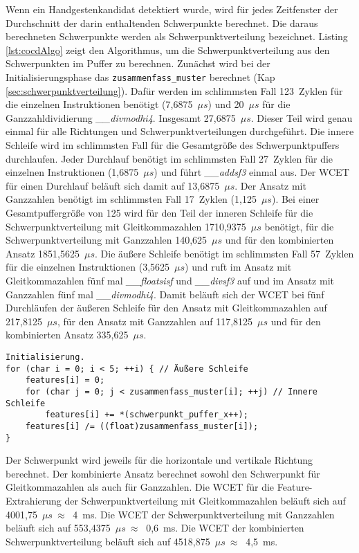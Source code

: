 Wenn ein Handgestenkandidat detektiert wurde, wird für jedes Zeitfenster der Durchschnitt der darin enthaltenden Schwerpunkte berechnet. Die daraus berechneten Schwerpunkte werden als Schwerpunktverteilung bezeichnet.
Listing \ref{lst:cocdAlgo} zeigt den Algorithmus, um die Schwerpunktverteilung aus den Schwerpunkten im Puffer zu berechnen. Zunächst wird bei der Initialisierungsphase das \texttt{zusammenfass\_muster} berechnet
(Kap \ref{sec:schwerpunktverteilung}). Dafür werden im schlimmsten Fall 123~Zyklen für die einzelnen Instruktionen benötigt (7,6875~$\mu s$) und 20~$\mu s$ für die Ganzzahldividierung \textit{\_\_divmodhi4}. Insgesamt
27,6875~$\mu s$. Dieser Teil wird genau einmal für alle Richtungen und Schwerpunktverteilungen durchgeführt.
\newline
\newline
Die innere Schleife wird im schlimmsten Fall für die Gesamtgröße des Schwerpunktpuffers durchlaufen.
Jeder Durchlauf benötigt im schlimmsten Fall 27~Zyklen für die einzelnen Instruktionen (1,6875~$\mu s$) und führt \textit{\_\_addsf3} einmal aus. Der WCET für einen Durchlauf beläuft sich damit auf 13,6875~$\mu s$.
Der Ansatz mit Ganzzahlen benötigt im schlimmsten Fall 17~Zyklen (1,125~$\mu s$). Bei einer Gesamtpuffergröße von 125 wird für den Teil der inneren Schleife für die Schwerpunktverteilung mit Gleitkommazahlen
1710,9375~$\mu s$ benötigt, für die Schwerpunktverteilung mit Ganzzahlen 140,625~$\mu s$ und für den kombinierten Ansatz 1851,5625~$\mu s$. Die äußere Schleife benötigt im schlimmsten Fall 57~Zyklen für die einzelnen
Instruktionen (3,5625~$\mu s$) und ruft im Ansatz mit Gleitkommazahlen fünf mal \textit{\_\_floatsisf} und \textit{\_\_divsf3} auf und im Ansatz mit Ganzzahlen fünf mal \textit{\_\_divmodhi4}. Damit beläuft sich der WCET
bei fünf Durchläufen der äußeren Schleife für den Ansatz mit Gleitkommazahlen auf 217,8125~$\mu s$, für den Ansatz mit Ganzzahlen auf 117,8125~$\mu s$ und für den kombinierten Ansatz 335,625~$\mu s$.
\begin{lstlisting}[label=lst:cocdAlgo,caption={Algorithmus um Schwerpunktverteilung in horizontaler Richtung zu berechnen.}]
Initialisierung.
for (char i = 0; i < 5; ++i) { // Äußere Schleife
    features[i] = 0;
    for (char j = 0; j < zusammenfass_muster[i]; ++j) // Innere Schleife
        features[i] += *(schwerpunkt_puffer_x++);
    features[i] /= ((float)zusammenfass_muster[i]);
}
\end{lstlisting}
Der Schwerpunkt wird jeweils für die horizontale und vertikale Richtung berechnet. Der kombinierte Ansatz berechnet sowohl den Schwerpunkt für Gleitkommazahlen als auch für Ganzzahlen. Die WCET für die Feature-Extrahierung
der Schwerpunktverteilung mit Gleitkommazahlen beläuft sich auf 4001,75~$\mu s\ \approx\ $ 4~ms. Die WCET der Schwerpunktverteilung mit Ganzzahlen beläuft sich auf 553,4375~$\mu s\ \approx\ $ 0,6~ms. Die WCET der kombinierten
Schwerpunktverteilung beläuft sich auf 4518,875~$\mu s\ \approx\ $ 4,5~ms.
